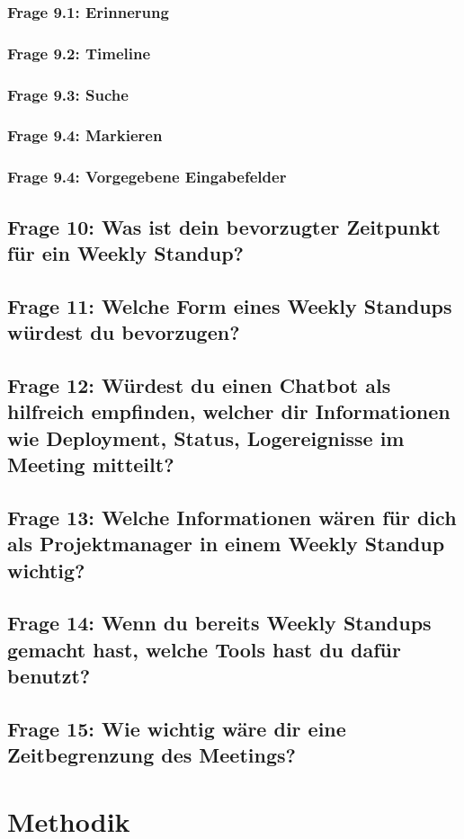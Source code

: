 \subsubsection{Frage 9.1: Erinnerung}
\subsubsection{Frage 9.2: Timeline}
\subsubsection{Frage 9.3: Suche}
\subsubsection{Frage 9.4: Markieren}
\subsubsection{Frage 9.4: Vorgegebene Eingabefelder}
\subsection{Frage 10: Was ist dein bevorzugter Zeitpunkt für ein Weekly Standup?}
\subsection{Frage 11: Welche Form eines Weekly Standups würdest du bevorzugen?}
\subsection{Frage 12: Würdest du einen Chatbot als hilfreich empfinden, welcher dir Informationen wie Deployment, Status, Logereignisse im Meeting mitteilt?}
\subsection{Frage 13: Welche Informationen wären für dich als Projektmanager in einem Weekly Standup wichtig?}
\subsection{Frage 14: Wenn du bereits Weekly Standups gemacht hast, welche Tools hast du dafür benutzt?}
\subsection{Frage 15: Wie wichtig wäre dir eine Zeitbegrenzung des Meetings?}

\section{Methodik}




